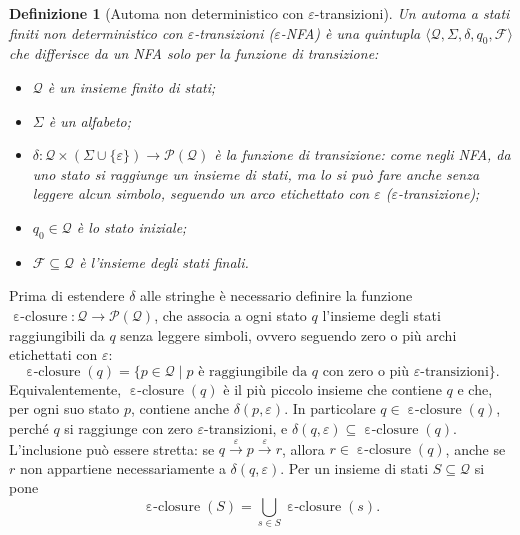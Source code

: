 \documentclass[a4paper, 11pt, oneside]{book}
\theoremstyle{formale}
\newtheorem*{definition}{Definizione}
\DeclareMathOperator{\eclosure}{\varepsilon\text{-}closure}
\begin{document}
    \begin{definition}[Automa non deterministico con $\varepsilon$-transizioni]
        Un \emph{automa a stati finiti non deterministico con $\varepsilon$-transizioni}
        ($\varepsilon$-NFA) \`e una quintupla
        $\langle \mathcal{Q}, \Sigma, \delta, q_0, \mathcal{F} \rangle$ che differisce da un
        NFA solo per la funzione di transizione:
        \begin{itemize}
            \item $\mathcal{Q}$ \`e un insieme finito di stati;
            \item $\Sigma$ \`e un alfabeto;
            \item $\delta \colon \mathcal{Q} \times (\Sigma \cup \{\varepsilon\}) \to
                \mathcal{P}(\mathcal{Q})$ \`e la \emph{funzione di transizione}: come negli
                NFA, da uno stato si raggiunge un insieme di stati, ma lo si pu\`o fare anche
                senza leggere alcun simbolo, seguendo un arco etichettato con $\varepsilon$
                (\emph{$\varepsilon$-transizione});
            \item $q_0 \in \mathcal{Q}$ \`e lo stato \emph{iniziale};
            \item $\mathcal{F} \subseteq \mathcal{Q}$ \`e l'insieme degli stati
                \emph{finali}.
        \end{itemize}
    \end{definition}

    Prima di estendere $\delta$ alle stringhe \`e necessario definire la funzione
    $\eclosure \colon \mathcal{Q} \to \mathcal{P}(\mathcal{Q})$, che associa a ogni stato
    $q$ l'insieme degli stati raggiungibili da $q$ senza leggere simboli, ovvero seguendo
    zero o pi\`u archi etichettati con $\varepsilon$:
    \begin{equation*}
        \eclosure(q) = \{p \in \mathcal{Q} \mid p \text{ \`e raggiungibile da } q
        \text{ con zero o pi\`u } \varepsilon\text{-transizioni}\}.
    \end{equation*}
    Equivalentemente, $\eclosure(q)$ \`e il pi\`u piccolo insieme che contiene $q$ e che,
    per ogni suo stato $p$, contiene anche $\delta(p, \varepsilon)$. In particolare
    $q \in \eclosure(q)$, perch\'e $q$ si raggiunge con zero $\varepsilon$-transizioni, e
    $\delta(q, \varepsilon) \subseteq \eclosure(q)$. L'inclusione pu\`o essere stretta: se
    $q \xrightarrow{\varepsilon} p \xrightarrow{\varepsilon} r$, allora
    $r \in \eclosure(q)$, anche se $r$ non appartiene necessariamente a
    $\delta(q, \varepsilon)$. Per un insieme di stati $S \subseteq \mathcal{Q}$ si pone
    \begin{equation*}
        \eclosure(S) = \bigcup_{s \in S} \eclosure(s).
    \end{equation*}
\end{document}
